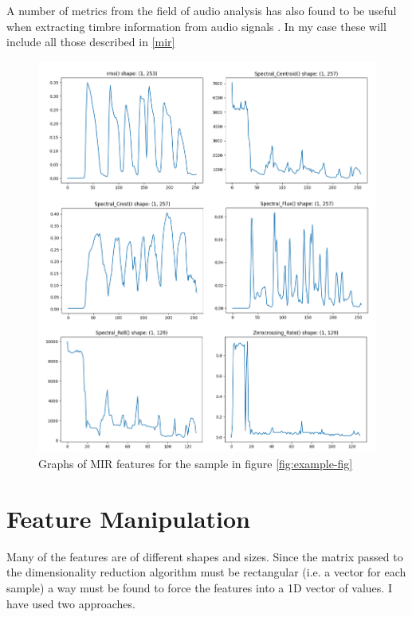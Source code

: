 \documentclass[a4paper, 12pt, twoside]{report}
\begin{document}
A number of metrics from the field of audio analysis has also found to be useful when extracting timbre information from audio signals \cite{article,klustr}. In my case these will include all those described in \ref{mir}

\begin{figure}[h!]
\centering
\includegraphics[width=.7\linewidth]{./Figures/mir_features.png}
\caption{Graphs of MIR features for the sample in figure \ref{fig:example-fig}}
\end{figure}

\section{Feature Manipulation}
\label{sec:org694b75f}

Many of the features are of different shapes and sizes. Since the matrix passed to the dimensionality reduction algorithm must be rectangular (i.e. a vector for each sample) a way must be found to force the features into a 1D vector of values. I have used two approaches.
\end{document}
